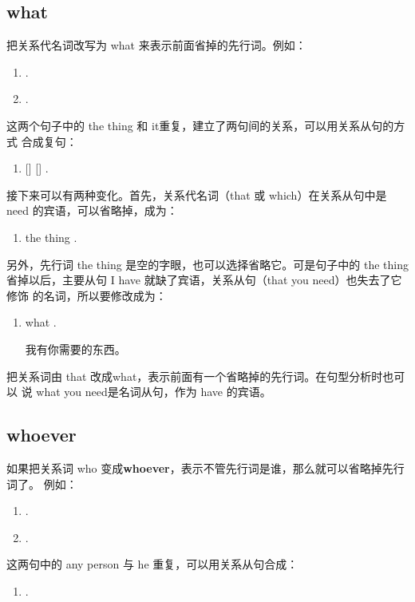 \subsection{what}

把关系代名词改写为 what 来表示前面省掉的先行词。例如：

\begin{enumerate}
\item {}  .
\item {}  .
\end{enumerate}
这两个句子中的 the thing 和 it重复，建立了两句间的关系，可以用关系从句的方式
合成复句：

\begin{enumerate}[resume]
\item {}  []
  []   .
\end{enumerate}

接下来可以有两种变化。首先，关系代名词（that 或 which）在关系从句中是
need 的宾语，可以省略掉，成为：

\begin{enumerate}[resume]
\item {}  the thing  .
\end{enumerate}

另外，先行词 the thing 是空的字眼，也可以选择省略它。可是句子中的 the thing
省掉以后，主要从句 I have 就缺了宾语，关系从句（that you need）也失去了它修饰
的名词，所以要修改成为：

\begin{enumerate}[resume]
\item {}  what  .

  我有你需要的东西。
\end{enumerate}

把关系词由 that 改成what，表示前面有一个省略掉的先行词。在句型分析时也可以
说 what you need是名词从句，作为 have 的宾语。

\subsection{whoever}

如果把关系词 who 变成\textbf{whoever}，表示不管先行词是谁，那么就可以省略掉先行词了。
例如：
\begin{enumerate}
\item {} .
\item {} .
\end{enumerate}
这两句中的 any person 与 he 重复，可以用关系从句合成：
\begin{enumerate}[resume]
\item {} 
   .
\end{enumerate}

